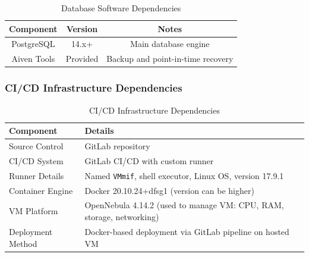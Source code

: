 \begin{table}[H]
    \centering
    \begin{tabular}{|c|c|c|}
        \hline
        \textbf{Component} & \textbf{Version} & \textbf{Notes}                    \\
        \hline
        PostgreSQL         & 14.x+            & Main database engine              \\
        \hline
        Aiven Tools        & Provided         & Backup and point-in-time recovery \\
        \hline
    \end{tabular}
    \caption{Database Software Dependencies}
    \label{tab:database_dependencies}
\end{table}

\subsubsection{CI/CD Infrastructure Dependencies}

\begin{table}[H]
    \centering
    \begin{tabular}{|p{}|p{}|}
        \hline
        \textbf{Component} & \textbf{Details}                                                     \\
        \hline
        Source Control     & GitLab repository                                                    \\
        \hline
        CI/CD System       & GitLab CI/CD with custom runner                                      \\
        \hline
        Runner Details     & Named \texttt{VMmif}, shell executor, Linux OS, version 17.9.1       \\
        \hline
        Container Engine   & Docker 20.10.24+dfsg1 (version can be higher)                        \\
        \hline
        VM Platform        & OpenNebula 4.14.2 (used to manage VM: CPU, RAM, storage, networking) \\
        \hline
        Deployment Method  & Docker-based deployment via GitLab pipeline on hosted VM             \\
        \hline
    \end{tabular}
    \caption{CI/CD Infrastructure Dependencies}
    \label{tab:cicd_dependencies}
\end{table}

